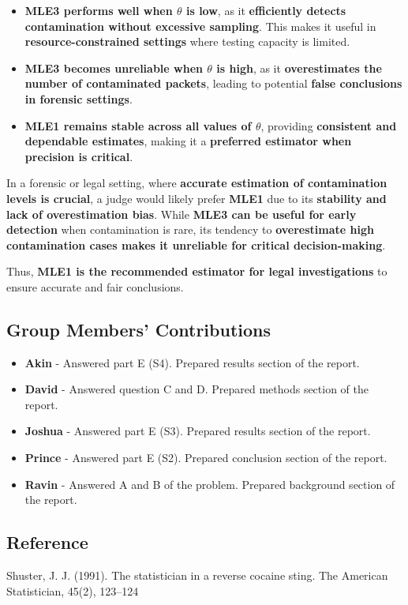 \documentclass[
  14pt,
]{article}
\providecommand{\tightlist}{%
  \setlength{\itemsep}{0pt}\setlength{\parskip}{0pt}}
\begin{document}
\begin{itemize}
\tightlist
\item
  \textbf{MLE3 performs well when \(\theta\) is low}, as it
  \textbf{efficiently detects contamination without excessive sampling}.
  This makes it useful in \textbf{resource-constrained settings} where
  testing capacity is limited.\\
\item
  \textbf{MLE3 becomes unreliable when \(\theta\) is high}, as it
  \textbf{overestimates the number of contaminated packets}, leading to
  potential \textbf{false conclusions in forensic settings}.\\
\item
  \textbf{MLE1 remains stable across all values of \(\theta\)},
  providing \textbf{consistent and dependable estimates}, making it a
  \textbf{preferred estimator when precision is critical}.
\end{itemize}

In a forensic or legal setting, where \textbf{accurate estimation of
contamination levels is crucial}, a judge would likely prefer
\textbf{MLE1} due to its \textbf{stability and lack of overestimation
bias}. While \textbf{MLE3 can be useful for early detection} when
contamination is rare, its tendency to \textbf{overestimate high
contamination cases makes it unreliable for critical decision-making}.

Thus, \textbf{MLE1 is the recommended estimator for legal
investigations} to ensure accurate and fair conclusions.

\subsection{\texorpdfstring{\textbf{Group Members'
Contributions}}{Group Members' Contributions}}\label{group-members-contributions}

\begin{itemize}
\tightlist
\item
  \textbf{Akin} - Answered part E (S4). Prepared results section of the
  report.\\
\item
  \textbf{David} - Answered question C and D. Prepared methods section
  of the report.\\
\item
  \textbf{Joshua} - Answered part E (S3). Prepared results section of
  the report.\\
\item
  \textbf{Prince} - Answered part E (S2). Prepared conclusion section of
  the report.\\
\item
  \textbf{Ravin} - Answered A and B of the problem. Prepared background
  section of the report.
\end{itemize}

\subsection{Reference}\label{reference}

Shuster, J. J. (1991). The statistician in a reverse cocaine sting. The
American Statistician, 45(2), 123--124
\end{document}
